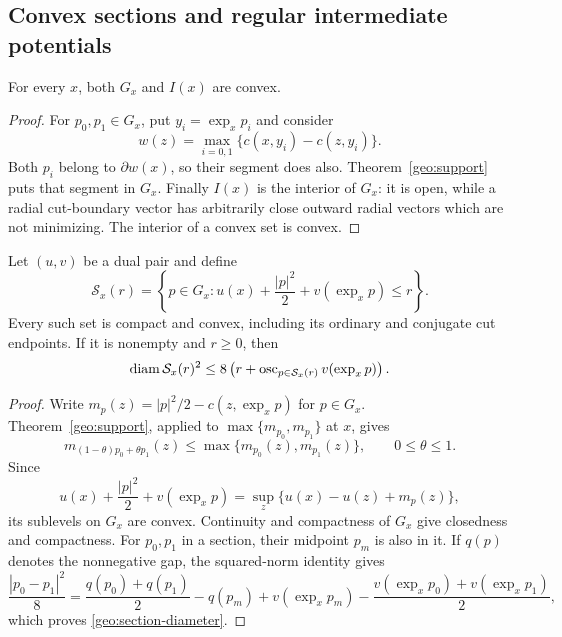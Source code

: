 \subsection{Convex sections and regular intermediate potentials}

\begin{corollary}
\label{geo:convexity}
For every $x$, both $G_x$ and $I(x)$ are convex.
\end{corollary}

\begin{proof}
For $p_0,p_1\in G_x$, put $y_i=\exp_xp_i$ and consider
\[
 w(z)=\max_{i=0,1}\{c(x,y_i)-c(z,y_i)\}.
\]
Both $p_i$ belong to $\partial w(x)$, so their segment does also.
Theorem~\ref{geo:support} puts that segment in $G_x$.
Finally $I(x)$ is the interior of $G_x$: it is open, while a radial
cut-boundary vector has arbitrarily close outward radial vectors
which are not minimizing.  The interior of a convex set is convex.
\end{proof}

\begin{corollary}
\label{geo:sections}
Let $(u,v)$ be a dual pair and define
\[
 \mathcal S_x(r)=\left\{p\in G_x:
    u(x)+\frac{|p|^2}{2}+v(\exp_xp)\leq r\right\}.
\]
Every such set is compact and convex, including its ordinary and
conjugate cut endpoints.  If it is nonempty and $r\geq0$, then
\begin{equation}
 \label{geo:section-diameter}
 \operatorname{diam}\mathcal S_x(r)^2
 \leq 8\left(r+
       \operatorname{osc}_{p\in\mathcal S_x(r)}v(\exp_xp)\right).
\end{equation}
\end{corollary}

\begin{proof}
Write $m_p(z)=|p|^2/2-c(z,\exp_xp)$ for $p\in G_x$.
Theorem~\ref{geo:support}, applied to
$\max\{m_{p_0},m_{p_1}\}$ at $x$, gives
\[
 m_{(1-\theta)p_0+\theta p_1}(z)
 \leq\max\{m_{p_0}(z),m_{p_1}(z)\},\qquad0\leq\theta\leq1.
\]
Since
\[
 u(x)+\frac{|p|^2}{2}+v(\exp_xp)
 =\sup_z\{u(x)-u(z)+m_p(z)\},
\]
its sublevels on $G_x$ are convex.  Continuity and compactness of
$G_x$ give closedness and compactness.  For $p_0,p_1$ in a section,
their midpoint $p_m$ is also in it.  If $q(p)$ denotes the nonnegative
gap, the squared-norm identity gives
\[
 \frac{|p_0-p_1|^2}{8}
 =\frac{q(p_0)+q(p_1)}2-q(p_m)
  +v(\exp_xp_m)-\frac{v(\exp_xp_0)+v(\exp_xp_1)}2,
\]
which proves \eqref{geo:section-diameter}.
\end{proof}

